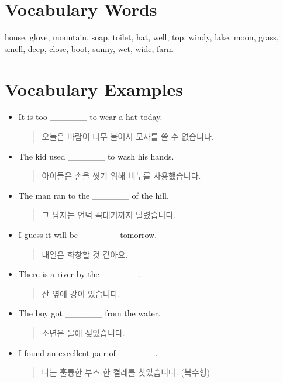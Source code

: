 \documentclass{article}
\begin{document}
\renewcommand{\familydefault}{\sfdefault}
\onehalfspacing
\fontsize{12pt}{14pt}\selectfont

\section*{Vocabulary Words}
\begin{addmargin}[1em]{1em}
house, glove, mountain, soap, toilet, hat, well, top, windy, lake, moon, grass, smell, deep, close, boot, sunny, wet, wide, farm
\end{addmargin}

\section*{Vocabulary Examples}
\begin{addmargin}[1em]{1em}
\begin{itemize}
    \item It is too \_\_\_\_\_\_ to wear a hat today.
    \begin{quote}
    오늘은 바람이 너무 불어서 모자를 쓸 수 없습니다.
    \end{quote}
    \item The kid used \_\_\_\_\_\_ to wash his hands.
    \begin{quote}
    아이들은 손을 씻기 위해 비누를 사용했습니다.
    \end{quote}
    \item The man ran to the \_\_\_\_\_\_ of the hill.
    \begin{quote}
    그 남자는 언덕 꼭대기까지 달렸습니다.
    \end{quote}
    \item I guess it will be \_\_\_\_\_\_ tomorrow.
    \begin{quote}
    내일은 화창할 것 같아요.
    \end{quote}
    \item There is a river by the \_\_\_\_\_\_.
    \begin{quote}
    산 옆에 강이 있습니다.
    \end{quote}
    \item The boy got \_\_\_\_\_\_ from the water.
    \begin{quote}
    소년은 물에 젖었습니다.
    \end{quote}
    \item I found an excellent pair of \_\_\_\_\_\_.
    \begin{quote}
    나는 훌륭한 부츠 한 켤레를 찾았습니다. (복수형)
    \end{quote}

\end{itemize}
\end{addmargin}
\end{document}
